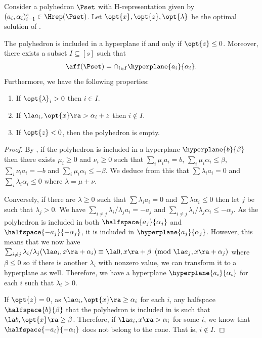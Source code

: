 \documentclass[11pt,twoside,a4paper,openright]{uclouvain-thesis}
\newcommand{\ineqnum}{s}
\begin{document}
\begin{myprop}
  \label{prop:affsubset}
  Consider a polyhedron $\Pset$ with H-representation given by
  $(a_i, \alpha_i)_{i=1}^{\ineqnum} \in \Hrep(\Pset)$.
  Let $\opt{x}, \opt{z}, \opt{\lambda}$ be the optimal solution of .

  The polyhedron is included in a hyperplane if and only if $\opt{z} \le 0$.
  Moreover, there exists a subset $I \subseteq [\ineqnum]$ such that
  \[ \aff(\Pset) = \cap_{i \in I} \hyperplane{a_i}{\alpha_i}. \]
  Furthermore, we have the following properties:
  \begin{enumerate} %
    \item
      \label{enum:dual_aff}
      If $\opt{\lambda}_i > 0$ then $i \in I$.
    \item
      \label{enum:primal_aff}
      If $\la a_i, \opt{x} \ra > \alpha_i + z$ then $i \notin I$.
    \item
      \label{enum:empty_aff}
      If $\opt{z} < 0$, then the polyhedron is empty.
  \end{enumerate}
  \begin{proof}
    By , if the polyhedron is included in a hyperplane $\hyperplane{b}{\beta}$
    then there exists $\mu_i \ge 0$ and $\nu_i \ge 0$ such that
    $\sum_i \mu_i a_i = b$, $\sum_i \mu_i \alpha_i \le \beta$, $\sum_i \nu_i a_i = -b$ and $\sum_i \mu_i \alpha_i \le -\beta$.
    We deduce from this that $\sum \lambda_i a_i = 0$ and $\sum_i \lambda_i \alpha_i \le 0$ where $\lambda = \mu + \nu$.

    Conversely, if there are $\lambda \ge 0$ such that $\sum \lambda_i a_i = 0$ and $\sum \lambda \alpha_i \le 0$ then let
    $j$ be such that $\lambda_j > 0$.
    We have $\sum_{i \neq j} \lambda_i/\lambda_j a_i = -a_j$ and $\sum_{i \neq j} \lambda_i/\lambda_j \alpha_i \le -\alpha_j$.
    As the polyhedron is included in both $\halfspace{a_j}{\alpha_j}$ and $\halfspace{-a_j}{-\alpha_j}$,
    it is included in $\hyperplane{a_j}{\alpha_j}$.
    However, this means that we now have $\sum_{i \neq j} \lambda_i/\lambda_j (\la a_i, x \ra + \alpha_i) \equiv \la 0, x \ra + \beta \pmod{\la a_j, x \ra + \alpha_j}$ where $\beta \le 0$ so if there is another $\lambda_i$
    with nonzero value, we can transform it to a hyperplane as well.
    Therefore, we have a hyperplane $\hyperplane{a_i}{\alpha_i}$ for each $i$ such that $\lambda_i > 0$.

    If $\opt{z} = 0$, as $\la a_i, \opt{x} \ra \ge \alpha_i$ for each $i$,
    any halfspace $\halfspace{b}{\beta}$ that the polyhedron is included in is such that $\la b, \opt{x} \ra \ge \beta$.
    Therefore, if $\la a_i, x \ra > \alpha_i$ for some $i$,
    we know that $\halfspace{-a_i}{-\alpha_i}$ does not belong to the cone.
    That is, $i \notin I$.
  \end{proof}
\end{myprop}
\end{document}
